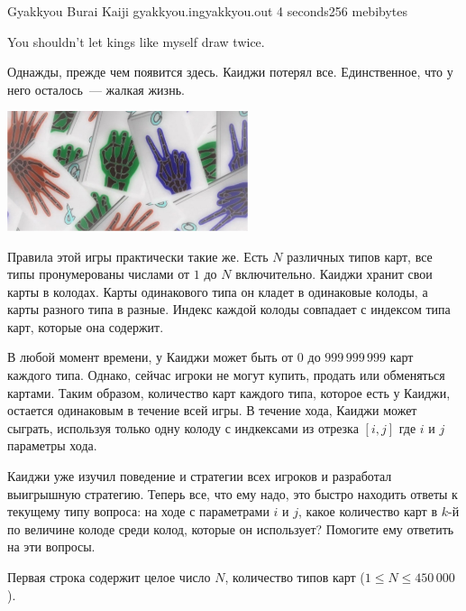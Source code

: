 \begin{problem}{Gyakkyou Burai Kaiji}
{gyakkyou.in}{gyakkyou.out}
{4 seconds}{256 mebibytes}


\epigraph
{
You shouldn't let kings like myself draw twice.
}{}

Однажды, прежде чем появится здесь.
Каиджи потерял все.
Единственное, что у него осталось~--- жалкая жизнь.

    \vspace{1em}
    \includegraphics[width=200pt]{pics/g.jpg}
    \vspace{1em}

Правила этой игры практически такие же. Есть $N$ различных типов карт, все типы пронумерованы числами от $1$ до $N$ включительно.
Каиджи хранит свои карты в колодах. Карты одинакового типа он кладет в одинаковые колоды, а карты разного типа в разные.
Индекс каждой колоды совпадает с индексом типа карт, которые она содержит.

В любой момент времени, у Каиджи может быть от $0$ до $999\,999\,999$ карт каждого типа.
Однако, сейчас игроки не могут купить, продать или обменяться картами.
Таким образом, количество карт каждого типа, которое есть у Каиджи, остается одинаковым в течение всей игры.
В течение хода, Каиджи может сыграть, используя только одну колоду с индкексами из отрезка $[i, j]$ где $i$ и $j$ параметры хода.

Каиджи уже изучил поведение и стратегии всех игроков и разработал выигрышную стратегию.
Теперь все, что ему надо, это быстро находить ответы к текущему типу вопроса:
на ходе с параметрами $i$ и $j$, какое количество карт в $k$-й по величине колоде среди колод, которые он использует?
Помогите ему ответить на эти вопросы.

Первая строка содержит целое число $N$, количество типов карт ($1 \le N \le 450\,000$).


\end{problem}
